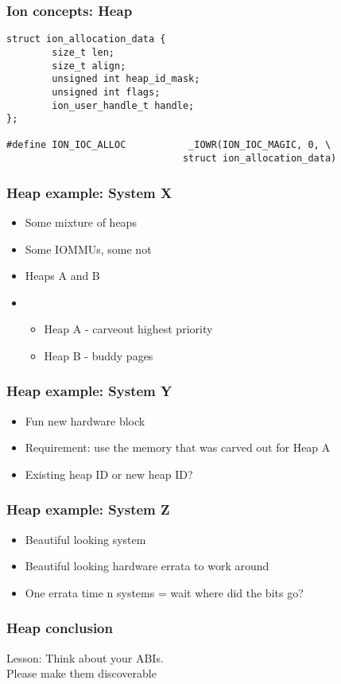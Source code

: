 \documentclass{beamer}
\begin{document}
\begin{frame}[fragile]
\frametitle{Ion concepts: Heap}
\begin{verbatim}
struct ion_allocation_data {
        size_t len;
        size_t align;
        unsigned int heap_id_mask;
        unsigned int flags;
        ion_user_handle_t handle;
};

#define ION_IOC_ALLOC           _IOWR(ION_IOC_MAGIC, 0, \
                               struct ion_allocation_data)
\end{verbatim}
\end{frame}


\begin{frame}
\frametitle{Heap example: System X}
\begin{itemize}
\item Some mixture of heaps
\item Some IOMMUs, some not
\item Heaps A and B
\item \begin{itemize}
\item Heap A - carveout highest priority
\item Heap B - buddy pages
\end{itemize}
\end{itemize}
\end{frame}

\begin{frame}
\frametitle{Heap example: System Y}
\begin{itemize}
\item Fun new hardware block
\item Requirement: use the memory that was carved out for Heap A
\item Existing heap ID or new heap ID?
\end{itemize}
\end{frame}

\begin{frame}
\frametitle{Heap example: System Z}
\begin{itemize}
\item Beautiful looking system
\item Beautiful looking hardware errata to work around
\item One errata time n systems = wait where did the bits go?
\end{itemize}
\end{frame}

\begin{frame}
\frametitle{Heap conclusion}
Lesson: Think about your ABIs. \\
Please make them discoverable
\end{frame}
\end{document}
